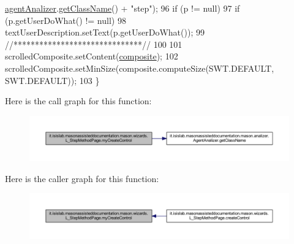 \begin{DoxyCode}
      \hyperlink{classit_1_1isislab_1_1masonassisteddocumentation_1_1mason_1_1wizards_1_1_l___step_method_page_ad5fe05afd95ed6f23ede53109ae21735}{agentAnalizer}.\hyperlink{classit_1_1isislab_1_1masonassisteddocumentation_1_1mason_1_1analizer_1_1_agent_analizer_a94492199c5e4873a07a2a46d15617937}{getClassName}() + \textcolor{stringliteral}{"step"});
96         \textcolor{keywordflow}{if} (p != null)
97             \textcolor{keywordflow}{if} (p.getUserDoWhat() != null)
98                 textUserDescription.setText(p.getUserDoWhat());
99         \textcolor{comment}{//******************************//}
100         
101         scrolledComposite.setContent(\hyperlink{classit_1_1isislab_1_1masonassisteddocumentation_1_1mason_1_1wizards_1_1_l___step_method_page_ad8812271bc4da1c3b7d4e415d45e875d}{composite});
102         scrolledComposite.setMinSize(composite.computeSize(SWT.DEFAULT, SWT.DEFAULT));
103     \}
\end{DoxyCode}


Here is the call graph for this function\-:
\nopagebreak
\begin{figure}[H]
\begin{center}
\leavevmode
\includegraphics[width=350pt]{classit_1_1isislab_1_1masonassisteddocumentation_1_1mason_1_1wizards_1_1_l___step_method_page_a5b1bfbacb4409e90ff72c3739e989672_cgraph}
\end{center}
\end{figure}




Here is the caller graph for this function\-:
\nopagebreak
\begin{figure}[H]
\begin{center}
\leavevmode
\includegraphics[width=350pt]{classit_1_1isislab_1_1masonassisteddocumentation_1_1mason_1_1wizards_1_1_l___step_method_page_a5b1bfbacb4409e90ff72c3739e989672_icgraph}
\end{center}
\end{figure}




